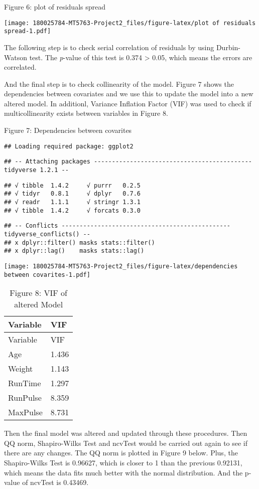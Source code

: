 \documentclass[]{article}
\begin{document}
Figure 6: plot of residuals spread

\texttt{[image: 180025784-MT5763-Project2\_files/figure-latex/plot of residuals spread-1.pdf]}

The following step is to check serial correlation of residuals by using
Durbin-Watson test. The \emph{p}-value of this test is 0.374
\textgreater{} 0.05, which means the errors are correlated.

And the final step is to check collinearity of the model. Figure 7 shows
the dependencies between covariates and we use this to update the model
into a new altered model. In additionl, Variance Inflation Factor (VIF)
was used to check if multicollinearity exists between variables in
Figure 8.

Figure 7: Dependencies between covarites

\begin{verbatim}
## Loading required package: ggplot2
\end{verbatim}

\begin{verbatim}
## -- Attaching packages -------------------------------------------- tidyverse 1.2.1 --
\end{verbatim}

\begin{verbatim}
## √ tibble  1.4.2     √ purrr   0.2.5
## √ tidyr   0.8.1     √ dplyr   0.7.6
## √ readr   1.1.1     √ stringr 1.3.1
## √ tibble  1.4.2     √ forcats 0.3.0
\end{verbatim}

\begin{verbatim}
## -- Conflicts ----------------------------------------------- tidyverse_conflicts() --
## x dplyr::filter() masks stats::filter()
## x dplyr::lag()    masks stats::lag()
\end{verbatim}

\texttt{[image: 180025784-MT5763-Project2\_files/figure-latex/dependencies between covarites-1.pdf]}

\begin{longtable}[]{@{}ll@{}}
\caption{Figure 8: VIF of altered Model}\tabularnewline
\toprule
Variable & VIF\tabularnewline
\midrule
\endfirsthead
\toprule
Variable & VIF\tabularnewline
\midrule
\endhead
Age & 1.436\tabularnewline
Weight & 1.143\tabularnewline
RunTime & 1.297\tabularnewline
RunPulse & 8.359\tabularnewline
MaxPulse & 8.731\tabularnewline
\bottomrule
\end{longtable}

Then the final model was altered and updated through these procedures.
Then QQ norm, Shapiro-Wilks Test and ncvTest would be carried out again
to see if there are any changes. The QQ norm is plotted in Figure 9
below. Plus, the Shapiro-Wilks Test is 0.96627, which is closer to 1
than the previous 0.92131, which means the data fits much better with
the normal distribution. And the p-value of ncvTest is 0.43469.
\end{document}
